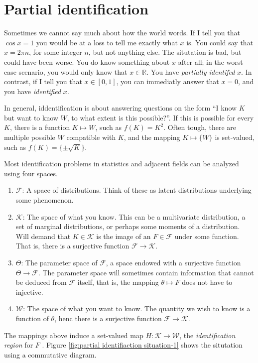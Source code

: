 \section{Partial identification}

Sometimes we cannot say much about how the world words. If I tell
you that $\cos x=1$ you would be at a loss to tell me exactly what
$x$ is. You could say that $x=2\pi n$, for some integer $n$, but
not anything else. The situtation is bad, but could have been worse.
You do know something about $x$ after all; in the worst case scenario,
you would only know that $x\in\mathbb{R}$. You have \emph{partially
identifed} $x$. In contrast, if I tell you that $x\in[0,1]$, you
can immediatly answer that $x=0$, and you have \emph{identified}
$x$.

In general, iddentification is about answering questions on the form
``I know $K$ but want to know $W$, to what extent is this possible?''.
If this is possible for every $K$, there is a function $K\mapsto W$,
such as $f(K)=K^{2}$. Often tough, there are multiple possible $W$
compatible with $K$, and the mapping $K\mapsto\{W\}$ is set-valued,
such as $f(K)=\{\pm\sqrt{K}\}$.

Most identification problems in statistics and adjacent fields can
be analyzed using four spaces.
\begin{enumerate}
\item $\mathcal{F}$: A space of distributions. Think of these as latent
distributions underlying some phenomenon. 
\item $\mathcal{K}$: The space of what you know. This can be a multivariate
distribution, a set of marginal distributions, or perhaps some moments
of a distribution. Will demand that $K\in\mathcal{K}$ is the image
of an $F\in\mathcal{F}$ under some function. That is, there is a
surjective function $\mathcal{F}\to\mathcal{K}$. 
\item $\mathcal{\Theta}$: The parameter space of $\mathcal{F}$, a space
endowed with a surjective function $\Theta\to\mathcal{F}$. The parameter
space will sometimes contain information that cannot be deduced from
$\mathcal{F}$ itself, that is, the mapping $\theta\mapsto F$ does
not have to injective. 
\item $\mathcal{W}$: The space of what you want to know. The quantity we
wish to know is a function of $\theta$, henc there is a surjective
function $\mathcal{F}\to\mathcal{K}$. 
\end{enumerate}
The mappings above induce a set-valued map $H:\mathcal{K}\to\mathcal{W}$,
the\emph{ identification region} for $F$ \parencite{Manski2003-aq}.
Figure \ref{fig:partial identifiaction situation-1} shows the situtation
using a commutative diagram. 

